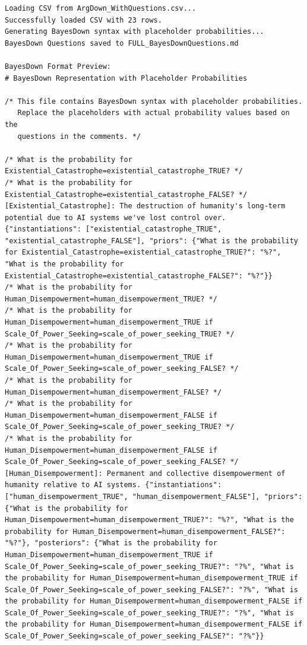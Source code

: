 \documentclass[
  11pt,
  letterpaper,
]{book}
\begin{document}
\begin{landscape}
\begin{verbatim}
Loading CSV from ArgDown_WithQuestions.csv...
Successfully loaded CSV with 23 rows.
Generating BayesDown syntax with placeholder probabilities...
BayesDown Questions saved to FULL_BayesDownQuestions.md

BayesDown Format Preview:
# BayesDown Representation with Placeholder Probabilities

/* This file contains BayesDown syntax with placeholder probabilities.
   Replace the placeholders with actual probability values based on the 
   questions in the comments. */

/* What is the probability for Existential_Catastrophe=existential_catastrophe_TRUE? */
/* What is the probability for Existential_Catastrophe=existential_catastrophe_FALSE? */
[Existential_Catastrophe]: The destruction of humanity's long-term potential due to AI systems we've lost control over. {"instantiations": ["existential_catastrophe_TRUE", "existential_catastrophe_FALSE"], "priors": {"What is the probability for Existential_Catastrophe=existential_catastrophe_TRUE?": "%?", "What is the probability for Existential_Catastrophe=existential_catastrophe_FALSE?": "%?"}}
/* What is the probability for Human_Disempowerment=human_disempowerment_TRUE? */
/* What is the probability for Human_Disempowerment=human_disempowerment_TRUE if Scale_Of_Power_Seeking=scale_of_power_seeking_TRUE? */
/* What is the probability for Human_Disempowerment=human_disempowerment_TRUE if Scale_Of_Power_Seeking=scale_of_power_seeking_FALSE? */
/* What is the probability for Human_Disempowerment=human_disempowerment_FALSE? */
/* What is the probability for Human_Disempowerment=human_disempowerment_FALSE if Scale_Of_Power_Seeking=scale_of_power_seeking_TRUE? */
/* What is the probability for Human_Disempowerment=human_disempowerment_FALSE if Scale_Of_Power_Seeking=scale_of_power_seeking_FALSE? */
[Human_Disempowerment]: Permanent and collective disempowerment of humanity relative to AI systems. {"instantiations": ["human_disempowerment_TRUE", "human_disempowerment_FALSE"], "priors": {"What is the probability for Human_Disempowerment=human_disempowerment_TRUE?": "%?", "What is the probability for Human_Disempowerment=human_disempowerment_FALSE?": "%?"}, "posteriors": {"What is the probability for Human_Disempowerment=human_disempowerment_TRUE if Scale_Of_Power_Seeking=scale_of_power_seeking_TRUE?": "?%", "What is the probability for Human_Disempowerment=human_disempowerment_TRUE if Scale_Of_Power_Seeking=scale_of_power_seeking_FALSE?": "?%", "What is the probability for Human_Disempowerment=human_disempowerment_FALSE if Scale_Of_Power_Seeking=scale_of_power_seeking_TRUE?": "?%", "What is the probability for Human_Disempowerment=human_disempowerment_FALSE if Scale_Of_Power_Seeking=scale_of_power_seeking_FALSE?": "?%"}}

\end{verbatim}
\end{landscape}
\end{document}
